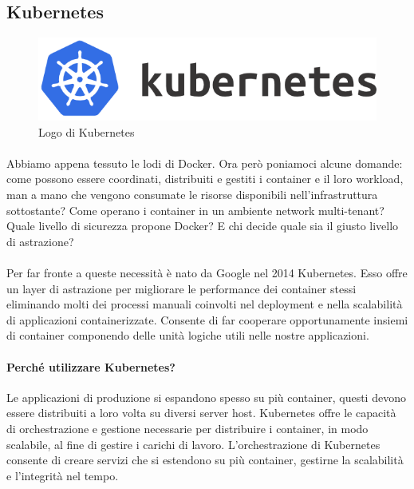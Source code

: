 \subsection{Kubernetes}
\begin{figure}[h!]
	\centering
	\includegraphics[width=\textwidth,keepaspectratio=true]{capitoli/imgs/kubernetes_full.png}
	\caption{Logo di Kubernetes}
\end{figure}

\paragraph{}
Abbiamo appena tessuto le lodi di Docker. Ora però poniamoci alcune domande: come possono essere coordinati, distribuiti e gestiti i container e il loro workload, man a mano che vengono consumate le risorse disponibili nell'infrastruttura sottostante? Come operano i container in un ambiente network multi-tenant? Quale livello di sicurezza propone Docker? E chi decide quale sia il giusto livello di astrazione?

\paragraph{}
Per far fronte a queste necessità è nato da Google nel 2014 Kubernetes. Esso offre un layer di astrazione per migliorare le performance dei container stessi eliminando molti dei processi manuali coinvolti nel deployment e nella scalabilità di applicazioni containerizzate. Consente di far cooperare opportunamente insiemi di container componendo delle unità logiche utili nelle nostre applicazioni.

\paragraph{Perché utilizzare Kubernetes?}
Le applicazioni di produzione si espandono spesso su più container, questi devono essere distribuiti a loro volta su diversi server host. Kubernetes offre le capacità di orchestrazione e gestione necessarie per distribuire i container, in modo scalabile, al fine di gestire i carichi di lavoro. L'orchestrazione di Kubernetes consente di creare servizi che si estendono su più container, gestirne la scalabilità e l'integrità nel tempo.

